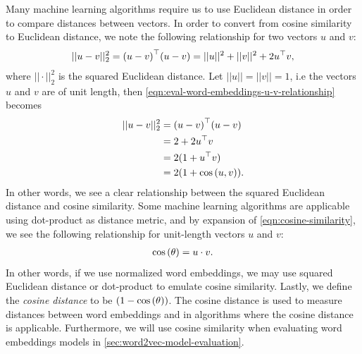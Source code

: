 Many machine learning algorithms require us to use Euclidean distance in order to compare distances between vectors. In order to convert from cosine similarity to Euclidean distance, we note the following relationship for two vectors $u$ and $v$:
\begin{align}
    ||u - v||_2^2 = {(u - v)}^\top (u - v) = ||u||^2 + ||v||^2 + 2{u}^\top v,
    \label{eqn:eval-word-embeddings-u-v-relationship}
\end{align}
where $||\cdot||_2^2$ is the squared Euclidean distance. Let $||u|| = ||v|| = 1$, i.e the vectors $u$ and $v$ are of unit length, then \cref{eqn:eval-word-embeddings-u-v-relationship} becomes
\begin{align}
    ||u - v||_2^2
    &= {(u - v)}^\top (u - v) \\
    &= 2 + 2{u}^\top v \\
    &= 2(1 + {u}^\top v) \\
    &= 2(1 + \cos \left(u, v\right)).
\end{align}
In other words, we see a clear relationship between the squared Euclidean distance and cosine similarity. Some machine learning algorithms are applicable using dot-product as distance metric, and by expansion of \cref{eqn:cosine-similarity}, we see the following relationship for unit-length vectors $u$ and $v$:
\begin{align}
    \cos\left(\theta\right) = u \cdot v.
\end{align}
In other words, if we use normalized word embeddings, we may use squared Euclidean distance or dot-product to emulate cosine similarity. Lastly, we define the \textit{cosine distance} to be $(1 - \cos\left(\theta\right))$. The cosine distance is used to measure distances between word embeddings and in algorithms where the cosine distance is applicable. Furthermore, we will use cosine similarity when evaluating word embeddings models in \cref{sec:word2vec-model-evaluation}.